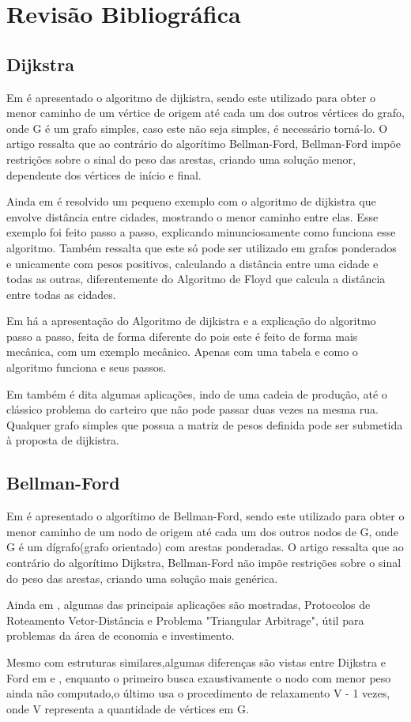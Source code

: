 \chapter{Revisão Bibliográfica}

\section{Dijkstra}

	Em \cite{algo} é apresentado o algoritmo de dijkistra, sendo este utilizado para obter o menor caminho de um vértice de origem até cada um dos outros vértices do  grafo, onde G é um grafo simples, caso este não seja simples, é necessário torná-lo. O artigo ressalta que ao contrário do algorítimo Bellman-Ford, Bellman-Ford impõe restrições sobre o sinal do peso das arestas, criando uma solução menor, dependente dos vértices de início e final.
	
	Ainda em \cite{algo} é resolvido um pequeno exemplo com o algoritmo de dijkistra que envolve distância entre cidades, mostrando o menor caminho entre elas. Esse exemplo foi feito passo a passo, explicando minunciosamente como funciona esse algoritmo. Também ressalta que este só pode ser utilizado em grafos ponderados e unicamente com pesos positivos, calculando a distância entre uma cidade e todas as outras, diferentemente do Algoritmo de Floyd que calcula a distância entre todas as cidades.
	
	Em \cite{barros2007algoritmo} há a apresentação do Algoritmo de dijkistra e a explicação do algoritmo passo a passo, feita de forma diferente do \cite{algo} pois este é feito de forma mais mecânica, com um exemplo mecânico. Apenas com uma tabela e como o algoritmo funciona e seus passos. 
	
	Em \cite{barros2007algoritmo} também é dita algumas aplicações, indo de uma cadeia de produção, até o clássico problema do carteiro que não pode passar duas vezes na mesma rua. Qualquer grafo simples que possua a matriz de pesos definida pode ser submetida à proposta de dijkistra.
	
\section{Bellman-Ford}	
	Em \cite{ford} é apresentado o algorítimo de Bellman-Ford, sendo este utilizado para obter o menor caminho de um nodo de origem até cada um dos outros nodos de  G, onde G é um dígrafo(grafo orientado) com arestas ponderadas. O artigo ressalta que ao contrário do algorítimo Dijkstra, Bellman-Ford não impõe restrições sobre o sinal do peso das arestas, criando uma solução mais genérica.

	Ainda em \cite{ford}, algumas das principais aplicações são mostradas, Protocolos de Roteamento Vetor-Distância e Problema "Triangular Arbitrage", útil para problemas da área de economia e investimento.

	Mesmo com estruturas similares,algumas diferenças são vistas entre Dijkstra e Ford em \cite{barros2007algoritmo} e \cite{ford}, enquanto o primeiro busca exaustivamente o nodo com menor peso ainda não computado,o último usa o procedimento de relaxamento V - 1 vezes, onde V representa a quantidade de vértices em G.
